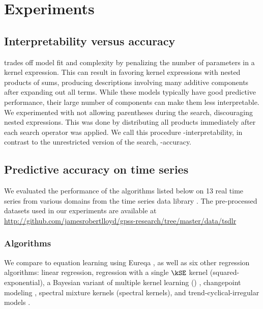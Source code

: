 \section{Experiments}
\label{sec:numerical}

\subsection{Interpretability versus accuracy}

\BIC{} trades off model fit and complexity by penalizing the number of parameters in a kernel expression.
This can result in \procedurename{} favoring kernel expressions with nested products of sums, producing descriptions involving many additive components after expanding out all terms.
While these models typically have good predictive performance, their large number of components can make them less interpretable.
We experimented with not allowing parentheses during the search, discouraging nested expressions.
This was done by distributing all products immediately after each search operator was applied.
We call this procedure \procedurename{}-interpretability, in contrast to the unrestricted version of the search, \procedurename{}-accuracy.


\subsection{Predictive accuracy on time series}
\label{sec:Predictive accuracy on time series}


We evaluated the performance of the algorithms listed below on 13 real time series from various domains from the time series data library \citep{TSDL}.
The pre-processed datasets used in our experiments are available at \\\url{http://github.com/jamesrobertlloyd/gpss-research/tree/master/data/tsdlr}



\subsubsection{Algorithms}

We compare \procedurename{} to equation learning using Eureqa \citep{Eureqa}, as well as six other regression algorithms:
linear regression,
\gp{} regression with a single $\kSE$ kernel (squared-exponential),
a Bayesian variant of multiple kernel learning (\MKL{}) \citep[e.g.][]{gonen2011multiple, bach2004multiple},
changepoint modeling \citep[e.g.][]{garnett2010sequential, saatcci2010gaussian, FoxDunson:NIPS2012},
spectral mixture kernels \citep{WilAda13} (spectral kernels),
and trend-cyclical-irregular models \citep[e.g.][]{lind2006basic}.

